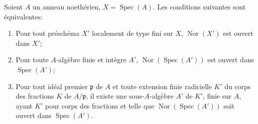 \begin{proposition}[6.13.7]
\label{IV.2.s6.13.7-fr}
Soient $A$ un anneau noethérien, $X=\operatorname{Spec}(A)$. Les conditions
suivantes sont équivalentes:
\begin{enumerate}
\item[a)] Pour tout préschéma $X'$ localement de type fini sur $X$,
$\operatorname{Nor}(X')$ est ouvert dans $X'$;
\item[b)] Pour toute $A$-algèbre finie et intègre $A'$,
$\operatorname{Nor}(\operatorname{Spec}(A'))$ est ouvert dans
$\operatorname{Spec}(A')$;
\item[c)] Pour tout idéal premier $\mathfrak p$ de $A$ et toute extension
finie radicielle $K'$ du corps des fractions $K$ de $A/\mathfrak p$, il
existe une sous-$A$-algèbre $A'$ de $K'$, finie sur $A$, ayant $K'$ pour
corps des fractions et telle que $\operatorname{Nor}(\operatorname{Spec}(A'))$
soit ouvert dans $\operatorname{Spec}(A')$.
\end{enumerate}
\end{proposition}

